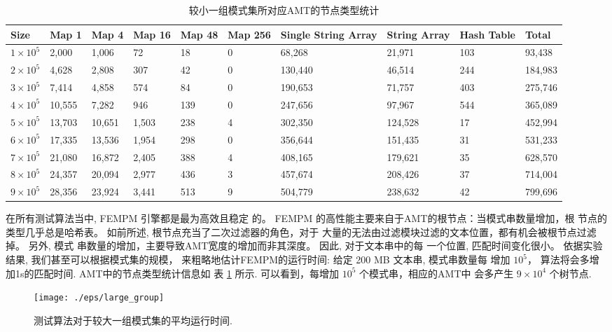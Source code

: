 \documentclass{ws-ijprai}
\begin{document}
\begin{table}[!htp]
  \scriptsize
  \caption{较小一组模式集所对应AMT的节点类型统计}
  \label{tab:small}
  \begin{tabular}{p{25pt}p{25pt}p{25pt}p{25pt}p{15pt}p{15pt}p{25pt}p{25pt}p{20pt}p{25pt}}
 \hline
 Size &
 Map 1 &
 Map 4 &
 Map 16 &
 Map 48 &
 Map 256 &
 Single String Array &
 String Array   &
 Hash Table &
 Total\\
\hline
$1 \times 10^5$ &  2,000 &  1,006 &    72 &  18 & 0 &  68,268 &  21,971 & 103 &  93,438 \\
$2 \times 10^5$ &  4,628 &  2,808 &   307 &  42 & 0 & 130,440 &  46,514 & 244 & 184,983 \\
$3 \times 10^5$ &  7,414 &  4,858 &   574 &  84 & 0 & 190,653 &  71,757 & 403 & 275,746 \\
$4 \times 10^5$ & 10,555 &  7,282 &   946 & 139 & 0 & 247,656 &  97,967 & 544 & 365,089 \\
$5 \times 10^5$ & 13,703 & 10,651 & 1,503 & 238 & 4 & 302,350 & 124,528 &  17 & 452,994 \\
$6 \times 10^5$ & 17,335 & 13,536 & 1,954 & 298 & 0 & 356,644 & 151,435 &  31 & 531,233 \\
$7 \times 10^5$ & 21,080 & 16,872 & 2,405 & 388 & 4 & 408,165 & 179,621 &  35 & 628,570 \\
$8 \times 10^5$ & 24,357 & 20,094 & 2,977 & 436 & 3 & 457,674 & 208,426 &  37 & 714,004 \\
$9 \times 10^5$ & 28,356 & 23,924 & 3,441 & 513 & 9 & 504,779 & 238,632 &  42 & 799,696 \\
\hline
  \end{tabular}
\end{table}

在所有测试算法当中, \textsf{FEMPM} 引擎都是最为高效且稳定
的。 \textsf{FEMPM} 的高性能主要来自于AMT的根节点：当模式串数量增加，根
节点的类型几乎总是哈希表。 如前所述, 根节点充当了二次过滤器的角色，对于
大量的无法由过滤模块过滤的文本位置，都有机会被根节点过滤掉。 另外, 模式
串数量的增加，主要导致AMT宽度的增加而非其深度。 因此, 对于文本串中的每
一个位置, 匹配时间变化很小。 依据实验结果, 我们甚至可以根据模式集的规模，
来粗略地估计\textsf{FEMPM}的运行时间: 给定 200 MB 文本串, 模式串数量每
增加 $10^5$， 算法将会多增加1s的匹配时间. AMT中的节点类型统计信息如
表 \ref{tab:small} 所示. 可以看到，每增加 $10^5$ 个模式串，相应的AMT中
会多产生 $9 \times 10^4$ 个树节点.

\begin{figure}[htbp]
  \centering
  \texttt{[image: ./eps/large\_group]}
  \caption{测试算法对于较大一组模式集的平均运行时间.}
  \label{fig:large_group}
\end{figure}
\end{document}
